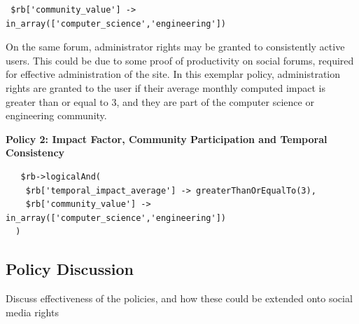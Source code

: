 \begin{verbatim}
 $rb['community_value'] -> in_array(['computer_science','engineering'])
\end{verbatim}

On the same forum, administrator rights may be granted to consistently active users. This could be due to some proof of productivity on social forums, required for effective administration of the site. In this exemplar policy, administration rights are granted to the user if their average monthly computed impact is greater than or equal to 3, and they are part of the computer science or engineering community. 

\begin{center}
 \textbf{Policy 2: Impact Factor, Community Participation and Temporal Consistency}
 \begin{verbatim}
   $rb->logicalAnd(
    $rb['temporal_impact_average'] -> greaterThanOrEqualTo(3),
    $rb['community_value'] -> in_array(['computer_science','engineering'])
  ) 
 \end{verbatim}
\end{center}

\subsection{Policy Discussion}

Discuss effectiveness of the policies, and how these could be extended onto social media rights
















